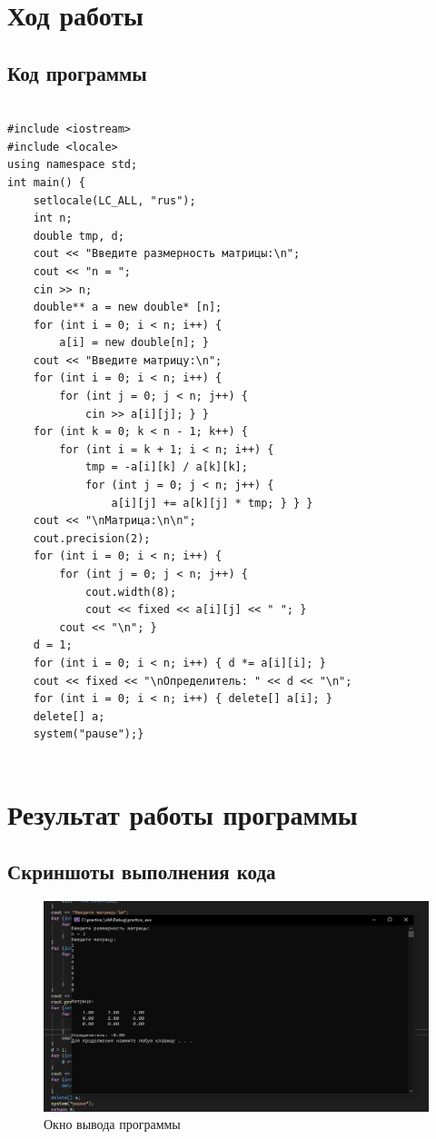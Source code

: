 \documentclass[12pt,a4paper]{scrartcl}
\begin{document}
	\section{Ход работы}
	\label{sec:exp}
	
	\subsection{Код программы}
	\label{sec:exp:code}
	\begin{verbatim}
	
#include <iostream>
#include <locale>
using namespace std;
int main() {
    setlocale(LC_ALL, "rus");
    int n;
    double tmp, d;
    cout << "Введите размерность матрицы:\n";
    cout << "n = ";
    cin >> n;
    double** a = new double* [n];
    for (int i = 0; i < n; i++) {
        a[i] = new double[n]; }
    cout << "Введите матрицу:\n";
    for (int i = 0; i < n; i++) {
        for (int j = 0; j < n; j++) {
            cin >> a[i][j]; } }
    for (int k = 0; k < n - 1; k++) {
        for (int i = k + 1; i < n; i++) {
            tmp = -a[i][k] / a[k][k];
            for (int j = 0; j < n; j++) {
                a[i][j] += a[k][j] * tmp; } } }
    cout << "\nМатрица:\n\n";
    cout.precision(2);
    for (int i = 0; i < n; i++) {
        for (int j = 0; j < n; j++) {
            cout.width(8);
            cout << fixed << a[i][j] << " "; }
        cout << "\n"; }
    d = 1;
    for (int i = 0; i < n; i++) { d *= a[i][i]; }
    cout << fixed << "\nОпределитель: " << d << "\n";
    for (int i = 0; i < n; i++) { delete[] a[i]; }
    delete[] a;
    system("pause");}
	
	\end{verbatim}
	
	\section{Результат работы программы}
	\label{sec:result}
	
	\subsection{Скриншоты выполнения кода}
	\label{sec:result:screen}
	\begin{figure}[h]
	\centering
	\includegraphics[width=1\textwidth]{skrin.jpg}
	\caption{Окно вывода программы}\label{figure:screen}
	\end{figure}
\end{document}
